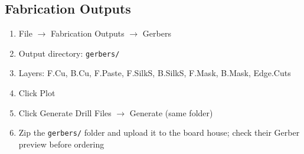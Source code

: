 \documentclass[11pt]{article}
\begin{document}
\subsection{Fabrication Outputs}
\begin{enumerate}
	\item File $\rightarrow$ Fabrication Outputs $\rightarrow$ Gerbers
	\item Output directory: \texttt{gerbers/}
	\item Layers: F.Cu, B.Cu, F.Paste, F.SilkS, B.SilkS, F.Mask, B.Mask,
	Edge.Cuts
	\item Click Plot
	\item Click Generate Drill Files $\rightarrow$ Generate (same folder)
	\item Zip the \texttt{gerbers/} folder and upload it to the board house;
	check their Gerber preview before ordering
\end{enumerate}
\end{document}
